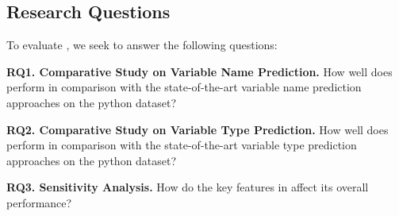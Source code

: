 \subsection{Research Questions}

To evaluate {\tool}, we seek to answer the following questions:

\noindent\textbf{RQ1. Comparative Study on Variable Name Prediction.}  How well does {\tool} perform in comparison with the state-of-the-art variable name prediction approaches on the python dataset?

\noindent\textbf{RQ2. Comparative Study on Variable Type Prediction.}  How well does {\tool} perform in comparison with the state-of-the-art variable type prediction approaches on the python dataset?

\noindent\textbf{RQ3. Sensitivity Analysis.} How do the key features in {\tool} affect its overall performance?
